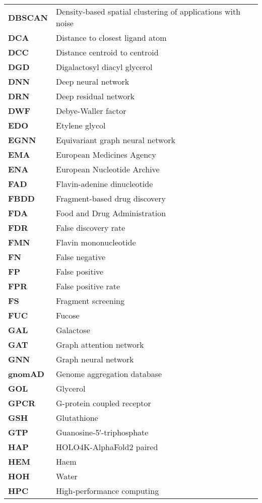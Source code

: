 \begin{longtable}[l]{@{}p{2.5cm}p{12cm}@{}}
\textbf{DBSCAN} & Density-based spatial clustering of applications with noise \\
\textbf{DCA} & Distance to closest ligand atom \\
\textbf{DCC} & Distance centroid to centroid \\
\textbf{DGD} & Digalactosyl diacyl glycerol \\
\textbf{DNN} & Deep neural network \\
\textbf{DRN} & Deep residual network \\
\textbf{DWF} & Debye-Waller factor \\
\textbf{EDO} & Etylene glycol \\
\textbf{EGNN} & Equivariant graph neural network \\
\textbf{EMA} & European Medicines Agency \\
\textbf{ENA} & European Nucleotide Archive \\
\textbf{FAD} & Flavin-adenine dinucleotide \\
\textbf{FBDD} & Fragment-based drug discovery \\
\textbf{FDA} & Food and Drug Administration \\
\textbf{FDR} & False discovery rate \\
\textbf{FMN} & Flavin mononucleotide \\
\textbf{FN} & False negative \\
\textbf{FP} & False positive \\
\textbf{FPR} & False positive rate \\
\textbf{FS} & Fragment screening \\
\textbf{FUC} & Fucose \\
\textbf{GAL} & Galactose \\
\textbf{GAT} & Graph attention network \\
\textbf{GNN} & Graph neural network \\
\textbf{gnomAD} & Genome aggregation database \\
\textbf{GOL} & Glycerol \\
\textbf{GPCR} & G-protein coupled receptor \\
\textbf{GSH} & Glutathione \\
\textbf{GTP} & Guanosine-5′-triphosphate \\
\textbf{HAP} & HOLO4K-AlphaFold2 paired \\
\textbf{HEM} & Haem \\
\textbf{HOH} & Water \\
\textbf{HPC} & High-performance computing \\

\end{longtable}
